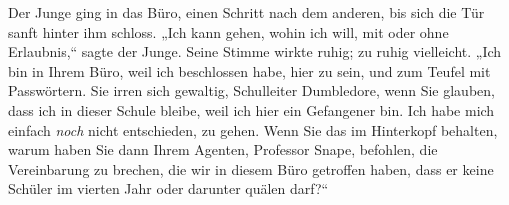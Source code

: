 Der Junge ging in das Büro, einen Schritt nach dem anderen, bis sich die Tür sanft hinter ihm schloss. „Ich kann gehen, wohin ich will, mit oder ohne Erlaubnis,“ sagte der Junge. Seine Stimme wirkte ruhig; zu ruhig vielleicht. „Ich bin in Ihrem Büro, weil ich beschlossen habe, hier zu sein, und zum Teufel mit Passwörtern. Sie irren sich gewaltig, Schulleiter Dumbledore, wenn Sie glauben, dass ich in dieser Schule bleibe, weil ich hier ein Gefangener bin. Ich habe mich einfach \emph{noch} nicht entschieden, zu gehen. Wenn Sie das im Hinterkopf behalten, warum haben Sie dann Ihrem Agenten, Professor Snape, befohlen, die Vereinbarung zu brechen, die wir in diesem Büro getroffen haben, dass er keine Schüler im vierten Jahr oder darunter quälen darf?“

